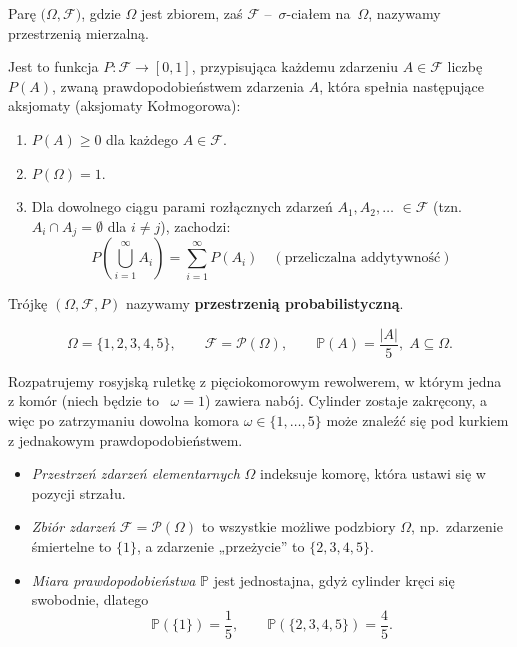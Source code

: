 \documentclass[final,a4paper,openany,12pt]{mwbk}
\begin{document}
\begin{Def}
Parę $\bigl(\Omega,\mathcal{F}\bigr)$, gdzie $\Omega$ jest zbiorem,
zaś $\mathcal{F}$ –~$\sigma$-ciałem na~$\Omega$, nazywamy
przestrzenią mierzalną.
\end{Def}

\begin{Def}
Jest to funkcja $P: \mathcal{F} \to [0, 1]$, przypisująca każdemu zdarzeniu $A \in \mathcal{F}$ liczbę $P(A)$, zwaną prawdopodobieństwem zdarzenia $A$, która spełnia następujące aksjomaty (aksjomaty Kołmogorowa):
\begin{enumerate}
    \item $P(A) \ge 0$ dla każdego $A \in \mathcal{F}$.
    \item $P(\Omega) = 1$.
    \item Dla dowolnego ciągu parami rozłącznych zdarzeń $A_1, A_2, \dots$ $\in \mathcal{F}$ (tzn. $A_i \cap A_j = \emptyset$ dla $i \neq j$), zachodzi:
    $$P\left(\bigcup_{i=1}^{\infty} A_i\right) = \sum_{i=1}^{\infty} P(A_i) \quad (\text{przeliczalna addytywność})$$
\end{enumerate}
\end{Def}

\begin{Def}
    Trójkę $(\Omega, \mathcal{F}, P)$ nazywamy \textbf{przestrzenią probabilistyczną}.
\end{Def}

\begin{Prz}
  \[
    \Omega=\{1,2,3,4,5\},\qquad
    \mathcal{F}=\mathcal{P}(\Omega),\qquad
    \mathbb{P}(A)=\frac{|A|}{5},\; A\subseteq\Omega.
  \]
\end{Prz}

Rozpatrujemy rosyjską ruletkę z pięciokomorowym rewolwerem, w którym
jedna z komór (niech będzie to ~\(\omega=1\)) zawiera nabój.
Cylinder zostaje zakręcony, a więc po zatrzymaniu dowolna komora
\(\omega\in\{1,\dots,5\}\) może znaleźć się pod kurkiem
z jednakowym prawdopodobieństwem.

\begin{itemize}
  \item \emph{Przestrzeń zdarzeń elementarnych} \(\Omega\) indeksuje komorę,
        która ustawi się w pozycji strzału.
  \item \emph{Zbiór zdarzeń} \(\mathcal{F}=\mathcal{P}(\Omega)\)
        to wszystkie możliwe podzbiory \(\Omega\),
        np.\ zdarzenie śmiertelne to \(\{1\}\),
        a zdarzenie „przeżycie” to \(\{2,3,4,5\}\).
  \item \emph{Miara prawdopodobieństwa} \(\mathbb{P}\) jest jednostajna,
        gdyż cylinder kręci się swobodnie, dlatego
        \[
          \mathbb{P}(\{1\})=\frac15, \qquad
          \mathbb{P}(\{2,3,4,5\})=\frac45.
        \]
\end{itemize}
\end{document}
